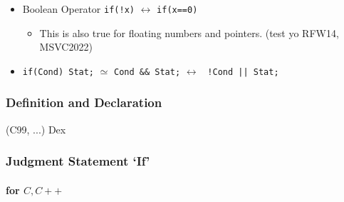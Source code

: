 \begin{itemize}
	\item{Boolean Operator \verb|if(!x)| $\leftrightarrow$ \verb|if(x==0)|
		\begin{itemize}\item This is also true for floating numbers and pointers. (test yo RFW14, MSVC2022) \end{itemize}
	}
	
	\item{\verb|if(Cond) Stat;| $\simeq$ \verb|Cond && Stat;| $\leftrightarrow$ \verb# !Cond || Stat; #
	}
\end{itemize}

\subsubsection{Definition and Declaration} (C99, ...)
{Dex}

\subsubsection{Judgment Statement `If'}

\paragraph{for $C,C++$}

















